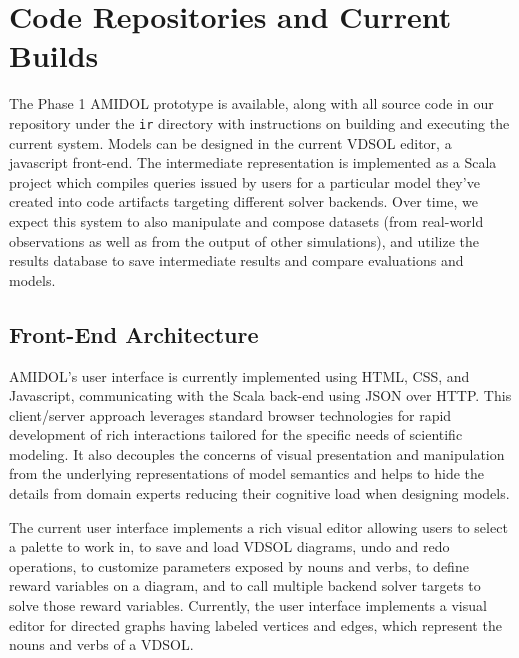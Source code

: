 \documentclass[11pt]{article}
\newcommand{\amidol}{\textsc{AMIDOL}}
\begin{document}
\section{Code Repositories and Current Builds}

The Phase 1 \amidol{} prototype is available, along with all source code in our repository under the \texttt{ir} directory with instructions on building and executing the current system.  Models can be designed in the current VDSOL editor, a javascript front-end.  The intermediate representation is implemented as a Scala project which compiles queries issued by users for a particular model they've created into code artifacts targeting different solver backends. Over time, we expect this system to also manipulate and compose datasets (from real-world observations as well as from the output of other simulations), and utilize the results database to save intermediate results and compare evaluations and models.


\subsection{Front-End Architecture}

\amidol{}'s user interface is currently implemented using HTML, CSS, and Javascript, communicating with the Scala back-end using JSON over HTTP.  This client/server approach leverages standard browser technologies for rapid development of rich interactions tailored for the specific needs of scientific modeling. It also decouples the concerns of visual presentation and manipulation from the underlying representations of model semantics and helps to hide the details from domain experts reducing their cognitive load when designing models.

The current user interface implements a rich visual editor allowing users to select a palette to work in, to save and load VDSOL diagrams, undo and redo operations, to customize parameters exposed by nouns and verbs, to define reward variables on a diagram, and to call multiple backend solver targets to solve those reward variables.
Currently, the user interface implements a visual editor for directed graphs having labeled vertices and edges, which represent the nouns and verbs of a VDSOL.
\end{document}
